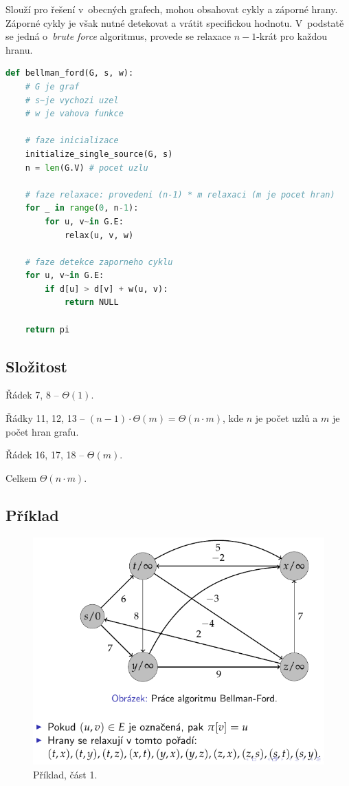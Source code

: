 Slouží pro řešení v~obecných grafech, mohou obsahovat cykly a záporné hrany. Záporné cykly je však nutné detekovat a vrátit specifickou hodnotu. V~podstatě se jedná o~\textit{brute force} algoritmus, provede se relaxace $n-1$-krát pro každou hranu.

\bigskip\noindent\begin{minipage}{\linewidth}
\begin{lstlisting}[language=Python, caption={Algoritmus Bellman-Ford. Proč $n-1$ iterací? Protože mezi libovolnými dvěma uzly v~grafu, existuje cesta o~maximálním počtu hran $n-1$.}]
def bellman_ford(G, s, w):
    # G je graf
    # s~je vychozi uzel
    # w je vahova funkce

    # faze inicializace
    initialize_single_source(G, s)
    n = len(G.V) # pocet uzlu

    # faze relaxace: provedeni (n-1) * m relaxaci (m je pocet hran)
    for _ in range(0, n-1):
        for u, v~in G.E:
            relax(u, v, w)

    # faze detekce zaporneho cyklu
    for u, v~in G.E:
        if d[u] > d[v] + w(u, v):
            return NULL

    return pi
\end{lstlisting}
\end{minipage}

\subsection*{Složitost}

\begin{compactitem}
    \item Řádek 7, 8 -- $\Theta(1)$.
    \item Řádky 11, 12, 13 -- $(n-1) \cdot \Theta(m) = \Theta(n \cdot m)$, kde $n$ je počet uzlů a $m$ je počet hran grafu.
    \item Řádek 16, 17, 18 -- $\Theta(m)$.
    \item Celkem $\Theta(n \cdot m)$.
\end{compactitem}

\subsection*{Příklad}

\begin{figure}[H]
    \centering
    \includegraphics[width=0.75\linewidth]{example_bellman_ford_p1.pdf}
    \caption{Příklad, část 1.}
\end{figure}

